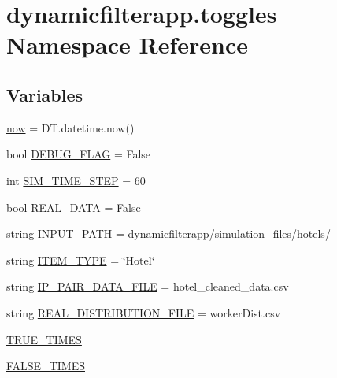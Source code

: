 \hypertarget{namespacedynamicfilterapp_1_1toggles}{}\section{dynamicfilterapp.\+toggles Namespace Reference}
\label{namespacedynamicfilterapp_1_1toggles}
\subsection*{Variables}
\begin{DoxyCompactItemize}
\item 
\hyperlink{namespacedynamicfilterapp_1_1toggles_afdc24ca189ea1f66dfd9245b4c970d59}{now} = D\+T.\+datetime.\+now()
\item 
bool \hyperlink{namespacedynamicfilterapp_1_1toggles_a5c62a4f8ba41755a0f5e48c54c4705b8}{D\+E\+B\+U\+G\+\_\+\+F\+L\+AG} = False
\item 
int \hyperlink{namespacedynamicfilterapp_1_1toggles_abcfb6d906296c8771261764bd2895303}{S\+I\+M\+\_\+\+T\+I\+M\+E\+\_\+\+S\+T\+EP} = 60
\item 
bool \hyperlink{namespacedynamicfilterapp_1_1toggles_a00674fe8ef8f59b37d7fe239813bb627}{R\+E\+A\+L\+\_\+\+D\+A\+TA} = False
\item 
string \hyperlink{namespacedynamicfilterapp_1_1toggles_aca6b14e235be3a92f729918cfcfed5e5}{I\+N\+P\+U\+T\+\_\+\+P\+A\+TH} = \textquotesingle{}dynamicfilterapp/simulation\+\_\+files/hotels/\textquotesingle{}
\item 
string \hyperlink{namespacedynamicfilterapp_1_1toggles_ab7ef0f87c772b28128250ee46f5390ab}{I\+T\+E\+M\+\_\+\+T\+Y\+PE} = \char`\"{}Hotel\char`\"{}
\item 
string \hyperlink{namespacedynamicfilterapp_1_1toggles_a43d654f8629542974ec1db04c0fc580a}{I\+P\+\_\+\+P\+A\+I\+R\+\_\+\+D\+A\+T\+A\+\_\+\+F\+I\+LE} = \textquotesingle{}hotel\+\_\+cleaned\+\_\+data.\+csv\textquotesingle{}
\item 
string \hyperlink{namespacedynamicfilterapp_1_1toggles_ad581376e3eb6ca15bbbe096863891cec}{R\+E\+A\+L\+\_\+\+D\+I\+S\+T\+R\+I\+B\+U\+T\+I\+O\+N\+\_\+\+F\+I\+LE} = \textquotesingle{}worker\+Dist.\+csv\textquotesingle{}
\item 
\hyperlink{namespacedynamicfilterapp_1_1toggles_a6794acc9ab30adea862f4077cf9adae7}{T\+R\+U\+E\+\_\+\+T\+I\+M\+ES}
\item 
\hyperlink{namespacedynamicfilterapp_1_1toggles_a809d01bf46cd20093532e7cbc0960874}{F\+A\+L\+S\+E\+\_\+\+T\+I\+M\+ES}

\end{DoxyCompactItemize}
